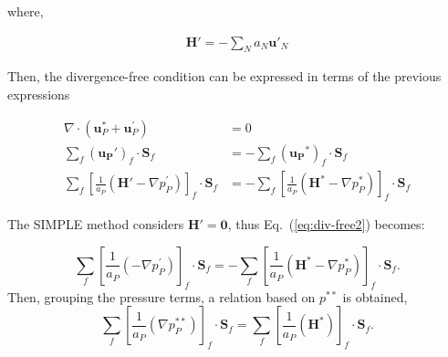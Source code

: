 \documentclass[final,3p,times,10pt,onecolumn]{myElsarticle}
\numberwithin{equation}{section}
\begin{document}
\noindent where,

\begin{align}
   \boldsymbol{H}' = - \sum_N a_N \boldsymbol{u}'_N 
\end{align}

Then, the divergence-free condition can be expressed in terms of the previous expressions

\begin{align} \label{eq:div-free1}
\nabla \cdot \left(\boldsymbol{u}_P^{*} + \boldsymbol{u}_P^{'}\right) &= 0 \\
\sum_f \left(\boldsymbol{u_P}'\right)_{f} \cdot \boldsymbol{S}_f &= -\sum_f \left(\boldsymbol{u_P}^{*}\right)_{f} \cdot \boldsymbol{S}_f \label{eq:div-free2} \\
\sum_f \left[\frac{1}{a_P}\left(\boldsymbol{H}' - \nabla p_P^{'}\right)\right]_f\cdot \boldsymbol{S}_f &= -\sum_f \left[\frac{1}{a_P}\left(\boldsymbol{H}^* - \nabla p_P^{*}\right)\right]_f \cdot \boldsymbol{S}_f \label{eq:div-free3}
\end{align}



The SIMPLE method considers $\boldsymbol{H}'=\boldsymbol{0}$, thus Eq.~(\ref{eq:div-free2}) becomes:

\begin{equation}
\sum_f 
\left[
\frac{1}{a_P}
\left(
-
\nabla p_P^{'}
\right)
\right]_f\cdot \boldsymbol{S}_f 
=
-\sum_f \left[\frac{1}{a_P}\left(\boldsymbol{H}^* - \nabla p_P^{*}\right)\right]_f \cdot
\boldsymbol{S}_f.
\label{eq:div-free4}    
\end{equation}
Then, grouping the pressure terms, a relation based on $p^{**}$ is obtained,
\begin{equation}
\sum_f 
\left[
\frac{1}{a_P}
\left(
\nabla p_P^{**}
\right)
\right]_f\cdot \boldsymbol{S}_f 
=
\sum_f 
\left[
\frac{1}{a_P}
\left(
\boldsymbol{H}^*
\right)
\right]_f
\cdot
\boldsymbol{S}_f.
\label{eq:div-free5}  
\end{equation}

\end{document}
